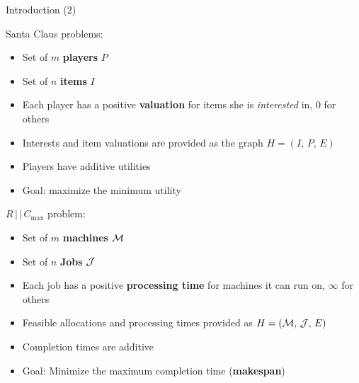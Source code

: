 \begin{frame}[t]{Introduction (2)}
    \begin{minipage}[t]{0.48\textwidth}
        Santa Claus problems:
        \begin{itemize}
            \item<2-> Set of $m$ \textbf{players} $P$
            \item<3-> Set of $n$ \textbf{items} $I$
            \item<4-> Each player has a positive \textbf{valuation} for items she is \emph{interested} in, 0 for others
            \item<5-> Interests and item valuations are provided as the graph $H = (I, \, P, \, E)$
            \item<6-> Players have additive utilities
            \item<7-> Goal: maximize the minimum utility
        \end{itemize}
    \end{minipage}    
    \begin{minipage}[t]{0.48\textwidth}
        $R \, | \, | \, C_{\max}$ problem:
        \begin{itemize}
            \item<8-> Set of $m$ \textbf{machines} $\mathcal{M}$
            \item<9-> Set of $n$ \textbf{Jobs} $\mathcal{J}$
            \item<10-> Each job has a positive \textbf{processing time} for machines it can run on, $\infty$ for others
            \item<11-> Feasible allocations and processing times provided as $H = (\mathcal{M}, \, \mathcal{J}, \, E)$
            \item<12-> Completion times are additive
            \item<13-> Goal: Minimize the maximum completion time (\textbf{makespan})
        \end{itemize}
    \end{minipage}
\end{frame}

